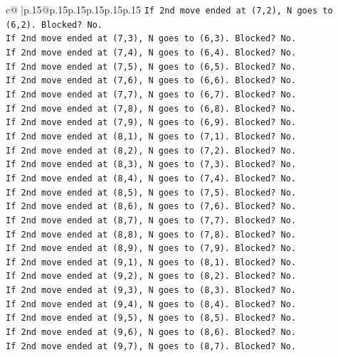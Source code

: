 \documentclass{article}
\begin{document}
{\begin{supertabular}{c@{$\;$}|p{.15\linewidth}@{}p{.15\linewidth}p{.15\linewidth}p{.15\linewidth}p{.15\linewidth}p{.15\linewidth}}
{{{\texttt{If 2nd move ended at (7,2), N goes to (6,2). Blocked? No.} \\
\texttt{If 2nd move ended at (7,3), N goes to (6,3). Blocked? No.} \\
\texttt{If 2nd move ended at (7,4), N goes to (6,4). Blocked? No.} \\
\texttt{If 2nd move ended at (7,5), N goes to (6,5). Blocked? No.} \\
\texttt{If 2nd move ended at (7,6), N goes to (6,6). Blocked? No.} \\
\texttt{If 2nd move ended at (7,7), N goes to (6,7). Blocked? No.} \\
\texttt{If 2nd move ended at (7,8), N goes to (6,8). Blocked? No.} \\
\texttt{If 2nd move ended at (7,9), N goes to (6,9). Blocked? No.} \\
\texttt{If 2nd move ended at (8,1), N goes to (7,1). Blocked? No.} \\
\texttt{If 2nd move ended at (8,2), N goes to (7,2). Blocked? No.} \\
\texttt{If 2nd move ended at (8,3), N goes to (7,3). Blocked? No.} \\
\texttt{If 2nd move ended at (8,4), N goes to (7,4). Blocked? No.} \\
\texttt{If 2nd move ended at (8,5), N goes to (7,5). Blocked? No.} \\
\texttt{If 2nd move ended at (8,6), N goes to (7,6). Blocked? No.} \\
\texttt{If 2nd move ended at (8,7), N goes to (7,7). Blocked? No.} \\
\texttt{If 2nd move ended at (8,8), N goes to (7,8). Blocked? No.} \\
\texttt{If 2nd move ended at (8,9), N goes to (7,9). Blocked? No.} \\
\texttt{If 2nd move ended at (9,1), N goes to (8,1). Blocked? No.} \\
\texttt{If 2nd move ended at (9,2), N goes to (8,2). Blocked? No.} \\
\texttt{If 2nd move ended at (9,3), N goes to (8,3). Blocked? No.} \\
\texttt{If 2nd move ended at (9,4), N goes to (8,4). Blocked? No.} \\
\texttt{If 2nd move ended at (9,5), N goes to (8,5). Blocked? No.} \\
\texttt{If 2nd move ended at (9,6), N goes to (8,6). Blocked? No.} \\
\texttt{If 2nd move ended at (9,7), N goes to (8,7). Blocked? No.} \\
}}}
\end{supertabular}}
\end{document}
